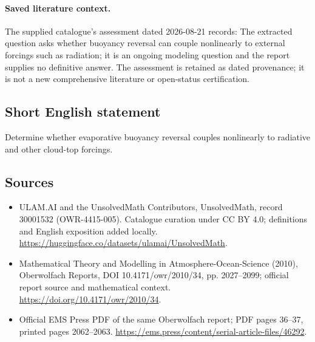 \documentclass[11pt]{article}
\begin{document}
\paragraph{Saved literature context.} The supplied catalogue's assessment dated 2026-08-21 records: The extracted question asks whether buoyancy reversal can couple nonlinearly to external forcings such as radiation; it is an ongoing modeling question and the report supplies no definitive answer. The assessment is retained as dated provenance; it is not a new comprehensive literature or open-status certification.
\subsection{Short English statement}
Determine whether evaporative buoyancy reversal couples nonlinearly to radiative and other cloud-top forcings.
\subsection{Sources}
\begin{itemize}
\item[\hypertarget{source:30001532:1}{S1}] ULAM.AI and the UnsolvedMath Contributors, UnsolvedMath, record 30001532 (OWR-4415-005). Catalogue curation under CC BY 4.0; definitions and English exposition added locally.
\url{https://huggingface.co/datasets/ulamai/UnsolvedMath}.
\item[\hypertarget{source:30001532:2}{S2}] Mathematical Theory and Modelling in Atmosphere-Ocean-Science (2010), Oberwolfach Reports, DOI 10.4171/owr/2010/34, pp. 2027--2099; official report source and mathematical context.
\url{https://doi.org/10.4171/owr/2010/34}.
\item[\hypertarget{source:30001532:3}{S3}] Official EMS Press PDF of the same Oberwolfach report; PDF pages 36--37, printed pages 2062--2063.
\url{https://ems.press/content/serial-article-files/46292}.
\end{itemize}
\label{end:30001532}
\end{document}
